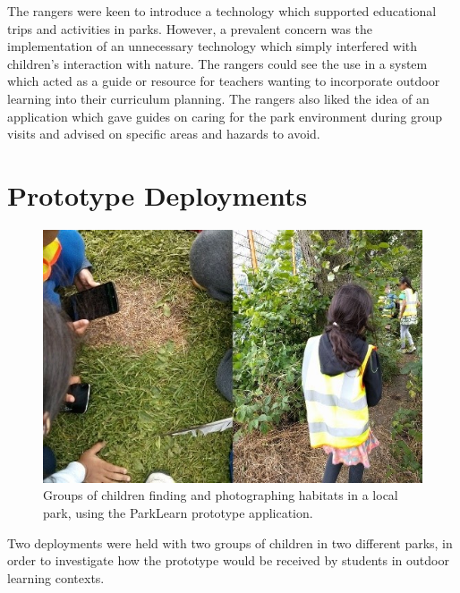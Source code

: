 The rangers were keen to introduce a technology which supported educational trips and activities in parks. However, a prevalent concern was the implementation of an unnecessary technology which simply interfered with children’s interaction with nature. The rangers could see the use in a system which acted as a guide or resource for teachers wanting to incorporate outdoor learning into their curriculum planning. The rangers also liked the idea of an application which gave guides on caring for the park environment during group visits and advised on specific areas and hazards to avoid.

\section{Prototype Deployments}

\begin{figure}
  \centering
  \includegraphics[width=0.8\columnwidth]{images/chapter04/prototypeDeployment.jpg}
  \caption[Children during the ParkLearn summer school deployment]{Groups of children finding and photographing habitats in a local park, using the ParkLearn prototype application.}
  \label{fig:prototypeDeployment}
\end{figure}

Two deployments were held with two groups of children in two different parks, in order to investigate how the prototype would be received by students in outdoor learning contexts.

